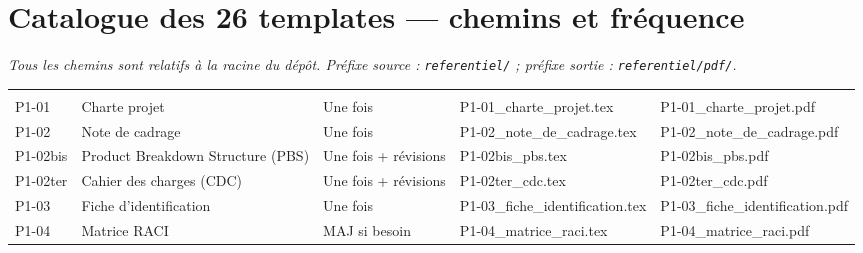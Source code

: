 \documentclass[11pt,a4paper,oneside]{report}
\begin{document}
\section{Catalogue des 26 templates --- chemins et fréquence}

\noindent\textit{Tous les chemins sont relatifs à la racine du dépôt. Préfixe source : \texttt{referentiel/} ; préfixe sortie : \texttt{referentiel/pdf/}.}

\vspace{4pt}

\renewcommand{\arraystretch}{1.3}
\newcommand{\pth}[1]{{\tiny\ttfamily #1}}
\begin{longtable}{C{1.1cm} L{3.2cm} C{2.2cm} L{4.4cm} L{4.4cm}}
\toprule
{}
 &  &  &  &  \\
\midrule
\endhead
\bottomrule
\endfoot

 \\
\midrule
P1-01 & Charte projet              & Une fois & \pth{P1-01\_charte\_projet.tex}        & \pth{P1-01\_charte\_projet.pdf} \\
P1-02 & Note de cadrage            & Une fois & \pth{P1-02\_note\_de\_cadrage.tex}      & \pth{P1-02\_note\_de\_cadrage.pdf} \\
P1-02bis & Product Breakdown Structure (PBS) & Une fois + révisions & \pth{P1-02bis\_pbs.tex} & \pth{P1-02bis\_pbs.pdf} \\
P1-02ter & Cahier des charges (CDC)  & Une fois + révisions & \pth{P1-02ter\_cdc.tex} & \pth{P1-02ter\_cdc.pdf} \\
P1-03 & Fiche d'identification     & Une fois & \pth{P1-03\_fiche\_identification.tex}  & \pth{P1-03\_fiche\_identification.pdf} \\
P1-04 & Matrice RACI               & MAJ si besoin & \pth{P1-04\_matrice\_raci.tex}     & \pth{P1-04\_matrice\_raci.pdf} \\
\midrule


\end{longtable}
\end{document}
